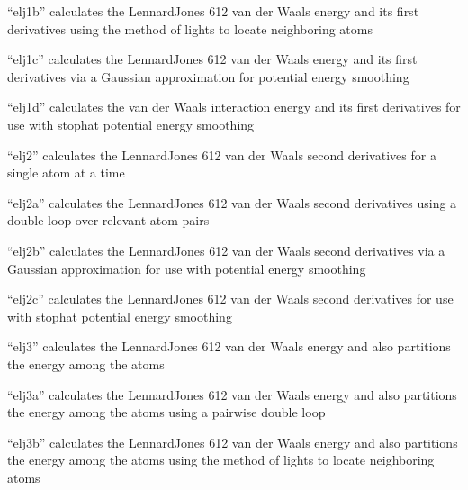 \documentclass[letterpaper,11pt,english]{sphinxmanual}
\begin{document}
“elj1b” calculates the Lennard\sphinxhyphen{}Jones 6\sphinxhyphen{}12 van der Waals energy and its first derivatives using the method of lights to locate neighboring atoms


“elj1c” calculates the Lennard\sphinxhyphen{}Jones 6\sphinxhyphen{}12 van der Waals energy  and its first derivatives via a Gaussian approximation for  potential energy smoothing


“elj1d” calculates the van der Waals interaction energy and its first derivatives for use with stophat potential energy smoothing


“elj2” calculates the Lennard\sphinxhyphen{}Jones 6\sphinxhyphen{}12 van der Waals second derivatives for a single atom at a time


“elj2a” calculates the Lennard\sphinxhyphen{}Jones 6\sphinxhyphen{}12 van der Waals second derivatives using a double loop over relevant atom pairs


“elj2b” calculates the Lennard\sphinxhyphen{}Jones 6\sphinxhyphen{}12 van der Waals second derivatives via a Gaussian approximation for use with potential energy smoothing


“elj2c” calculates the Lennard\sphinxhyphen{}Jones 6\sphinxhyphen{}12 van der Waals second derivatives for use with stophat potential energy smoothing


“elj3” calculates the Lennard\sphinxhyphen{}Jones 6\sphinxhyphen{}12 van der Waals energy and also partitions the energy among the atoms


“elj3a” calculates the Lennard\sphinxhyphen{}Jones 6\sphinxhyphen{}12 van der Waals energy and also partitions the energy among the atoms using a pairwise double loop


“elj3b” calculates the Lennard\sphinxhyphen{}Jones 6\sphinxhyphen{}12 van der Waals energy and also partitions the energy among the atoms using the method of lights to locate neighboring atoms
\end{document}
